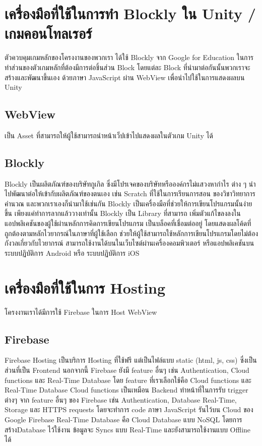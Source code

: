 \section{เครื่องมือที่ใช้ในการทำ Blockly ใน Unity / เกมคอนโทลเรอร์}
ตัวควบคุมเกมหลักของโครงงานของพวกเรา ได้ใช้ Blockly 
จาก Google for Education ในการทำส่วนของตัวเกมหลักที่ต้องมีการต่อชิ้นส่วน 
Block โดยแต่ละ Block ที่นำมาต่อกันนั้นพวกเราจะสร้างและพัฒนาขึ้นเอง ด้วยภาษา 
JavaScript ผ่าน WebView เพื่อนำไปใช้ในการแสดงผลบน Unity
\subsection{WebView}
เป็น Asset ที่สามารถให้ผู้ใช้สามารถนำหน้าเว็ปเข้าไปแสดงผลในตัวเกม Unity ได้~\cite{unw}
\subsection{Blockly}
Blockly เป็นผลิตภัณฑ์ของบริษัทกูเกิล ซึ่งมีโปรเจคของบริษัทหรือองค์กรไม่แสวงหากำไร 
ต่าง ๆ นำไปพัฒนาต่อให้เข้ากับผลิตภัณฑ์ของตนเอง เช่น Scratch ที่ใช้ในการเรียนการสอน
ของวิชาวิทยาการคำนวณ
และพวกเราเองก็นำมาใช้เช่นกัน Blockly 
เป็นเครื่องมือที่ช่วยให้การเขียนโปรแกรมนั้นง่ายขึ้น 
เพียงแค่ทำการลากแล้ววางเท่านั้น   Blockly เป็น Library ที่สามารถ
เพิ่มตัวแก้ไขลงลงในแอปพลิเคชันของผู้ใช้ผ่านหลักการคิดการเขียนโปรแกรม
เป็นบล็อคที่เชื่อมต่ออยู่ โดยแสดงผลโค้ดที่ถูกต้องตามหลักไวยากรณ์ในภาษาที่ผู้ใช้เลือก 
ช่วยให้ผู้ใช้สามารถใช้หลักการเขียนโปรแกรมโดยไม่ต้องกังวลเกี่ยวกับไวยากรณ์ 
สามารถใช้งานได้บนในเว็บไซต์ผ่านเครื่องคอมพิวเตอร์ หรือแอปพลิเคชันบน 
ระบบปฏิบัติการ Android หรือ ระบบปฏิบัติการ iOS~\cite{blc}

\section{เครื่องมือที่ใช้ในการ Hosting}
โครงงานเราได้มีการใช้ Firebase ในการ Host WebView
\subsection{Firebase}
Firebase Hosting เป็นบริการ Hosting ที่ใช้ฟรี 
แต่เป็นไฟล์แบบ static (html, js, css) 
ซึ่งเป็นส่วนที่เป็น Frontend นอกจากนี้ Firebase 
ยังมี feature อื่นๆ เช่น Authentication, Cloud functions 
และ Real-Time Database โดย feature ที่เราเลือกใช้คือ 
Cloud functions และ Real-Time Database\newline
Cloud functions เป็นเหมือน Backend ทำหน้าที่ในการรับ 
trigger ต่างๆ จาก feature อื่นๆ ของ Firebase 
เช่น Authentication, Database Real-Time, Storage 
และ HTTPS requests โดยจะทำการ code ภาษา JavaScript 
รันไว้บน Cloud ของ Google\newline
Firebase Real-Time Database คือ Cloud Database 
แบบ NoSQL โดยการสร้างDatabase ไว้ใช้งาน ข้อมูลจะ Syncs 
แบบ Real-Time และยังสามารถใช้งานแบบ Offline ได้\newline

